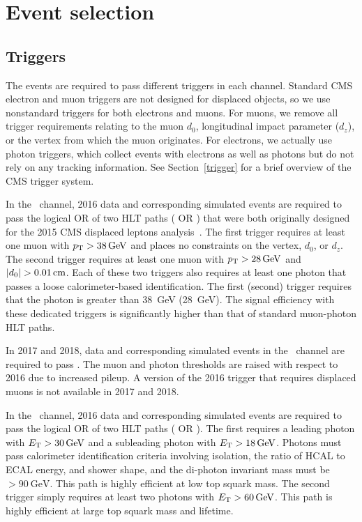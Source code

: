 \section{Event selection}
\label{selection}
\subsection{Triggers}
The events are required to pass different triggers in each channel. Standard CMS electron and muon triggers are not designed for displaced objects, so we use nonstandard triggers for both electrons and muons. For muons, we remove all trigger requirements relating to the muon $d_0$, longitudinal impact parameter ($d_z$), or the vertex from which the muon originates. For electrons, we actually use photon triggers, which collect events with electrons as well as photons but do not rely on any tracking information. See Section~\ref{trigger} for a brief overview of the CMS trigger system.

In the \Pe\Pgm\ channel, 2016 data and corresponding simulated events are required to pass the logical OR of two HLT paths ( OR ) that were both originally designed for the 2015 CMS displaced leptons analysis~\cite{displaced_leptons_bing}. The first trigger requires at least one muon with $\pt>\SI{38}{\GeV}$ and places no constraints on the vertex, $d_0$, or $d_z$. The second trigger requires at least one muon with $\pt>\SI{28}{\GeV}$ and $\ad>\SI{0.01}{\cm}$. Each of these two triggers also requires at least one photon that passes a loose calorimeter-based identification. The first (second) trigger requires that the photon \ET is greater than \SI{38}{\GeV} (\SI{28}{\GeV}). The signal efficiency with these dedicated triggers is significantly higher than that of standard muon-photon HLT paths.

In 2017 and 2018, data and corresponding simulated events in the \Pe\Pgm\ channel are required to pass . The muon \pt and photon \ET thresholds are raised with respect to 2016 due to increased pileup. A version of the 2016 trigger that requires displaced muons is not available in 2017 and 2018.

In the \Pe\Pe\ channel, 2016 data and corresponding simulated events are required to pass the logical OR of two HLT paths ( OR  ). The first requires a leading photon with $E_{\mathrm{T}}>30\,\text{Ge\hspace{-.08em}V}$ and a subleading photon with $\ET>\SI{18}{\GeV}$. Photons must pass calorimeter identification criteria involving isolation, the ratio of HCAL to ECAL energy, and shower shape, and the di-photon invariant mass must be $>\SI{90}{\GeV}$. This path is highly efficient at low top squark mass. The second trigger simply requires at least two photons with $\ET>\SI{60}{\GeV}$. This path is highly efficient at large top squark mass and lifetime.

